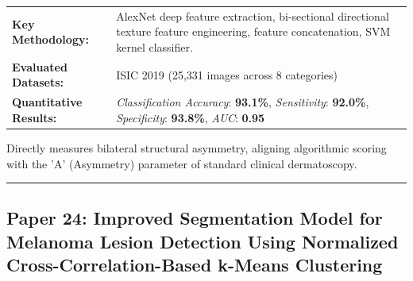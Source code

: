 \documentclass[10pt,a4paper]{article}
\begin{document}
\vspace{4pt}
\begin{tabularx}{\linewidth}{p{3.2cm}X}
\toprule
\textbf{Key Methodology:} & AlexNet deep feature extraction, bi-sectional directional texture feature engineering, feature concatenation, SVM kernel classifier. \\
\textbf{Evaluated Datasets:} & ISIC 2019 (25,331 images across 8 categories) \\
\textbf{Quantitative Results:} & \textit{Classification Accuracy}: \textbf{93.1\%}, \textit{Sensitivity}: \textbf{92.0\%}, \textit{Specificity}: \textbf{93.8\%}, \textit{AUC}: \textbf{0.95} \\
\bottomrule
\end{tabularx}
\vspace{4pt}
\begin{tcolorbox}[utilitybox,title=Clinical Utility and Real-World Impact]
Directly measures bilateral structural asymmetry, aligning algorithmic scoring with the 'A' (Asymmetry) parameter of standard clinical dermatoscopy.
\end{tcolorbox}
\vspace{12pt}
\hrule
\vspace{12pt}
\subsection*{Paper 24: Improved Segmentation Model for Melanoma Lesion Detection Using Normalized Cross-Correlation-Based k-Means Clustering}
\end{document}
